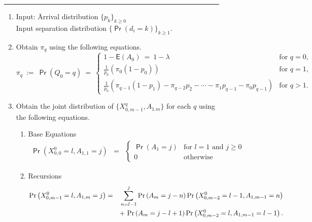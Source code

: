 \documentclass[11pt]{article}
\newcommand{\prob}[1]{\mathsf{\Pr}\left(#1\right)}
\newcommand{\EXP}[1]{\mathsf{E}\left(#1\right)}
\begin{document}
\small{
\begin{figure}
\rule{6.3in}{2mm}
    {\small{
        \begin{enumerate}
        \item 
          \begin{tabbing}
            Input: \=Arrival distribution $\{p_k\}_{k\geq 0}$\\
            \>Input separation distribution $\{ \prob{d_i=k} \}_{k
              \geq 1}.$\\ 
          \end{tabbing}


        \item Obtain $\pi_q$ using the following equations.
          \begin{displaymath}
            \pi_q \ := \ \prob{Q_0=q} \ = \ 
            \begin{cases} 
              1 - \EXP{A_0}  \ = \ 1 - \lambda & \mbox{for $q=0$,} \\
              \frac{1}{p_0}\left( \pi_0(1-p_0) \right) & \mbox{for $q=1$,} \\
              \frac{1}{p_0}\left( \pi_{q-1}(1-p_1) - \pi_{q-2} p_2 -
                \cdots - \pi_1 p_{q-1} - \pi_0 p_{q-1}  \right) & \mbox{for $q >
                1$.} 
            \end{cases} 
          \end{displaymath}

        \item Obtain the joint distribution of $\{X^q_{0,m-1},
          A_{1.m}\}$ for each $q$ using the following equations.
          \begin{enumerate}
          \item Base Equations 
            \begin{eqnarray*}
              \prob{X_{0,0}^0 = l, A_{1,1} = j} &=& 
              \begin{cases} 
                \prob{A_1 = j } & \mbox{for $l=1$ and $j \ge 0$}\\
                0 & \mbox{otherwise}
              \end{cases}
            \end{eqnarray*}

          \item Recursions
            \begin{eqnarray*}
              \prob{X_{0,m-1}^0=l , A_{1,m}=j }
              &=&\sum_{n=l-1}^{j} \prob{A_m=j-n}
              \prob{X^0_{0,m-2}=l-1, A_{1,m-1} = n}  \nonumber \\   
              &&\hspace{-0.0in}  + \ \prob{A_m=j-l+1} \prob{X_{0,m-2}^0=l,
                A_{1,m-1} = l-1} . 
            \end{eqnarray*}
              

\end{enumerate}
\end{enumerate}}}
\end{figure}}
\end{document}
